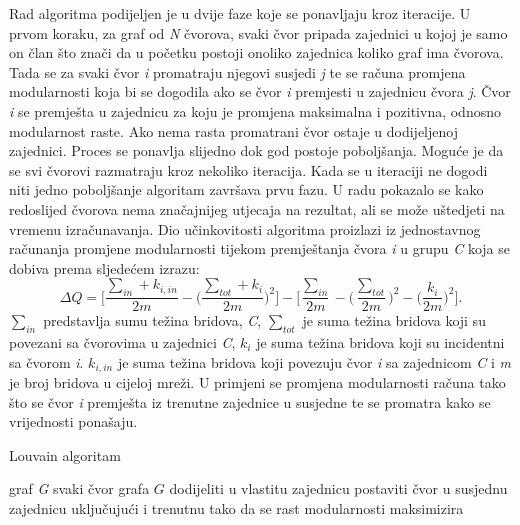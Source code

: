 Rad algoritma podijeljen je u dvije faze koje se ponavljaju kroz iteracije. U prvom koraku, za graf od \textit{N} čvorova, svaki čvor pripada zajednici u kojoj je samo on član što znači da u početku postoji onoliko zajednica koliko graf ima čvorova. Tada se za svaki čvor \textit{i} promatraju njegovi susjedi \textit{j} te se računa promjena modularnosti koja bi se dogodila ako se čvor \textit{i} premjesti u zajednicu čvora \textit{j}. Čvor \textit{i} se premješta u zajednicu za koju je promjena maksimalna i pozitivna, odnosno modularnost raste. Ako nema rasta promatrani čvor ostaje u dodijeljenoj zajednici. Proces se ponavlja slijedno dok god postoje poboljšanja. Moguće je da se svi čvorovi razmatraju kroz nekoliko iteracija. Kada se u iteraciji ne dogodi niti jedno poboljšanje algoritam završava prvu fazu. U radu \cite{blondel2008fast} pokazalo se kako redoslijed čvorova nema značajnijeg utjecaja na rezultat, ali se može uštedjeti na vremenu izračunavanja. Dio učinkovitosti algoritma proizlazi iz jednostavnog računanja promjene modularnosti tijekom premještanja čvora \textit{i} u grupu \textit{C} koja se dobiva prema sljedećem izrazu: 
\begin{equation}
	\Delta Q =  \bigg[ \frac{\sum_{in} + k_{i,in}}{2m} - \bigg( \dfrac{\sum_{tot} + k_{i} }{2m} \bigg)^{2} \bigg] 
	- 
	\bigg[ \dfrac{\sum_{in}}{2m} - \big( \dfrac{\sum_{tot}}{2m} \big)^{2} - \bigg( \dfrac{k_{i}}{2m} \bigg)^{2} \bigg] .
\end{equation}
\bigskip
$\sum_{in}$ predstavlja sumu težina bridova, \textit{C}, $\sum_{tot}$ je suma težina bridova koji su povezani sa čvorovima u zajednici \textit{C}, $k_{i}$ je suma težina bridova koji su incidentni sa čvorom \textit{i}. $k_{i,in}$ je suma težina bridova koji povezuju čvor \textit{i} sa zajednicom \textit{C} i \textit{m} je broj bridova u cijeloj mreži. U primjeni se promjena modularnosti računa tako što se čvor \textit{i} premješta iz trenutne zajednice u susjedne te se promatra kako se vrijednosti ponašaju.

\bigskip
\begin{algorithm}
	\caption{Louvain algoritam}
	\begin{algorithmic}[1]
		\REQUIRE graf \textit{G}
		\REPEAT 
		\STATE svaki čvor grafa $G$ dodijeliti u vlastitu zajednicu
		\STATE postaviti čvor u susjednu zajednicu uključujući i trenutnu tako da se rast modularnosti maksimizira
		\ENDFOR
		\ENDWHILE
		\ELSE {} 
		\ENDIF
		\UNTIL{}
	\end{algorithmic}
\end{algorithm}
\bigskip

